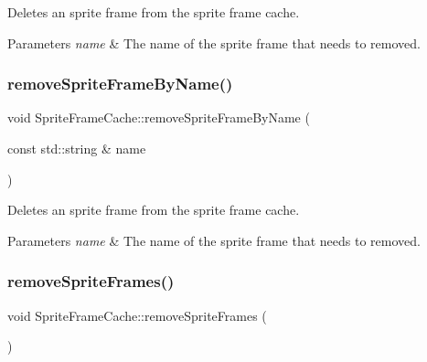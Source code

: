 Deletes an sprite frame from the sprite frame cache.


\begin{DoxyParams}{Parameters}
{\em name} & The name of the sprite frame that needs to removed. \\
\hline
\end{DoxyParams}
\mbox{\label{classSpriteFrameCache_a970b7aba25986a18fe2353bf1e587f44}} 
\subsubsection{\texorpdfstring{remove\+Sprite\+Frame\+By\+Name()}{removeSpriteFrameByName()}\hspace{0.1cm}{\footnotesize\ttfamily [2/2]}}
{\footnotesize\ttfamily void Sprite\+Frame\+Cache\+::remove\+Sprite\+Frame\+By\+Name (\begin{DoxyParamCaption}\item[{const std\+::string \&}]{name }\end{DoxyParamCaption})}

Deletes an sprite frame from the sprite frame cache.


\begin{DoxyParams}{Parameters}
{\em name} & The name of the sprite frame that needs to removed. \\
\hline
\end{DoxyParams}
\mbox{\label{classSpriteFrameCache_ad39158545a4c85b1ef33187450e1e7f0}} 
\subsubsection{\texorpdfstring{remove\+Sprite\+Frames()}{removeSpriteFrames()}\hspace{0.1cm}{\footnotesize\ttfamily [1/2]}}
{\footnotesize\ttfamily void Sprite\+Frame\+Cache\+::remove\+Sprite\+Frames (\begin{DoxyParamCaption}{ }\end{DoxyParamCaption})}

